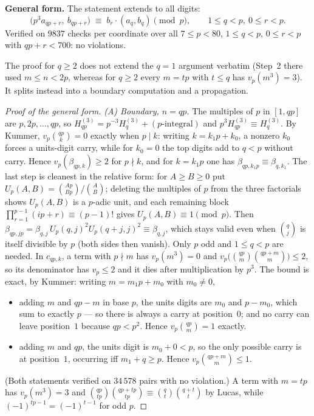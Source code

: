 \medskip
\noindent\textbf{General form.}  The statement extends to all digits:
\[
  \boxed{\;\bigl(p^3a_{qp+r},\ b_{qp+r}\bigr)\;\equiv\;b_r\cdot(a_q,b_q)\pmod p,
  \qquad 1\le q<p,\ 0\le r<p.\;}
\]
Verified on $9837$ checks per coordinate over all $7\le p<80$, $1\le q<p$, $0\le r<p$ with
$qp+r<700$: no violations.

The proof for $q\ge2$ does not extend the $q=1$ argument verbatim (Step~2 there used
$m\le n<2p$, whereas for $q\ge2$ every $m=tp$ with $t\le q$ has $v_p(m^3)=3$).  It splits
instead into a boundary computation and a propagation.

\begin{proof}[Proof of the general form]
\emph{(A) Boundary, $n=qp$.}  The multiples of $p$ in $[1,qp]$ are $p,2p,\dots,qp$, so
$H^{(3)}_{qp}=p^{-3}H^{(3)}_q+(p\text{-integral})$ and $p^3H^{(3)}_{qp}\equiv H^{(3)}_q$.
By Kummer, $v_p\binom{qp}k=0$ exactly when $p\mid k$: writing $k=k_1p+k_0$, a nonzero $k_0$
forces a units-digit carry, while for $k_0=0$ the top digits add to $q<p$ without carry.  Hence
$v_p(\beta_{qp,k})\ge2$ for $p\nmid k$, and for $k=k_1p$ one has
$\beta_{qp,k_1p}\equiv\beta_{q,k_1}$.  The last step is cleanest in the relative form: for
$A\ge B\ge0$ put $U_p(A,B)=\binom{Ap}{Bp}/\binom AB$; deleting the multiples of $p$ from the
three factorials shows $U_p(A,B)$ is a $p$-adic unit, and each remaining block
$\prod_{r=1}^{p-1}(ip+r)\equiv(p-1)!$ gives $U_p(A,B)\equiv1\pmod p$.  Then
$\beta_{qp,jp}=\beta_{q,j}\,U_p(q,j)^2U_p(q+j,j)^2\equiv\beta_{q,j}$, which stays valid even when
$\binom qj$ is itself divisible by $p$ (both sides then vanish).  Only $p$ odd and $1\le q<p$ are
needed.
In $c_{qp,k}$, a term with $p\nmid m$ has $v_p(m^3)=0$ and
$v_p\bigl(\binom{qp}m\binom{qp+m}m\bigr)\le2$, so its denominator has $v_p\le2$ and it dies after
multiplication by $p^3$.  The bound is exact, by Kummer: writing $m=m_1p+m_0$ with $m_0\ne0$,
\begin{itemize}
\item adding $m$ and $qp-m$ in base $p$, the units digits are $m_0$ and $p-m_0$, which sum to
exactly $p$ — so there is always a carry at position~$0$; and no carry can leave position~$1$
because $qp<p^2$.  Hence $v_p\binom{qp}m=1$ exactly.
\item adding $m$ and $qp$, the units digit is $m_0+0<p$, so the only possible carry is at
position~$1$, occurring iff $m_1+q\ge p$.  Hence $v_p\binom{qp+m}m\le1$.
\end{itemize}
(Both statements verified on $34\,578$ pairs with no violation.)  A term
with $m=tp$ has $v_p(m^3)=3$ and $\binom{qp}{tp}\binom{qp+tp}{tp}\equiv\binom qt\binom{q+t}t$ by
Lucas, while $(-1)^{tp-1}=(-1)^{t-1}$ for odd $p$.


\end{proof}
